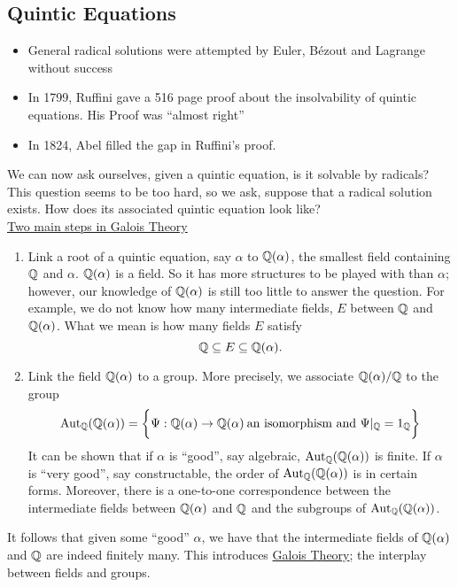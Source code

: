 \documentclass[11pt]{article}
\begin{document}
\subsection{Quintic Equations}
\begin{itemize}
\item General radical solutions were attempted by Euler, B\'ezout and Lagrange
without success
\item In 1799, Ruffini gave a 516 page proof about the insolvability of quintic
equations. His Proof was ``almost right''
\item In 1824, Abel filled the gap in Ruffini's proof.
\end{itemize}
We can now ask ourselves, given a quintic equation, is it solvable by radicals?
This question seems to be too hard, so we ask, suppose that a radical solution
exists. How does its associated quintic equation look like?\\

\underline{Two main steps in Galois Theory}
\begin{enumerate}
\item Link a root of a quintic equation, say $\alpha$ to $\mathbb{Q}(\alpha)$, the
smallest field containing $\mathbb{Q}$ and $\alpha$. $\mathbb{Q}(\alpha)$ is a field. So it has
more structures to be played with than $\alpha$; however, our knowledge of
$\mathbb{Q}(\alpha)$ is still too little to answer the question. For example, we do not
know how many intermediate fields, $E$ between $\mathbb{Q}$ and $\mathbb{Q}(\alpha)$.
What we mean is how many fields $E$ satisfy
\begin{equation*}
\mathbb{Q} \subseteq E \subseteq \mathbb{Q}(\alpha).
\end{equation*}
\item Link the field $\mathbb{Q}(\alpha)$ to a group. More precisely, we associate
$\mathbb{Q}(\alpha)/\mathbb{Q}$ to the group
\begin{equation*}
\operatorname{Aut}_{\mathbb{Q}} (\mathbb{Q}(\alpha)) = \bigg\{\Psi : \mathbb{Q}(\alpha) \to \mathbb{Q}(\alpha)\>\text{an
isomorphism and } \Psi|_{\mathbb{Q}} = 1_{\mathbb{Q}}\bigg\}
\end{equation*}
It can be shown that if $\alpha$ is ``good'', say algebraic, $\operatorname{Aut}_{\mathbb{Q}}
(\mathbb{Q}(\alpha))$ is finite. If $\alpha$ is ``very good'', say constructable, the
order of $\operatorname{Aut}_{\mathbb{Q}} (\mathbb{Q}(\alpha))$ is in certain forms. Moreover, there is a
one-to-one correspondence between the intermediate fields between $\mathbb{Q}(\alpha)$
and $\mathbb{Q}$ and the subgroups of $\operatorname{Aut}_{\mathbb{Q}} (\mathbb{Q}(\alpha))$.
\end{enumerate}

It follows that given some ``good'' $\alpha$, we have that the
intermediate fields of $\mathbb{Q}(\alpha)$ and $\mathbb{Q}$ are indeed finitely many. This
introduces \underline{Galois Theory}; the interplay between fields and groups.
\end{document}
